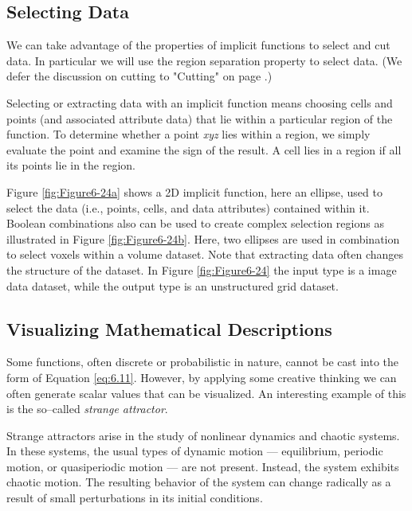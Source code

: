 \subsection{Selecting Data}

We can take advantage of the properties of implicit functions to select and cut data. In particular we will use the region separation property to select data. (We defer the discussion on cutting to "Cutting" on page \pageref{subsec:cutting}.)

Selecting or extracting data with an implicit function means choosing cells and points (and associated attribute data) that lie within a particular region of the function. To determine whether a point \emph{xyz} lies within a region, we simply evaluate the point and examine the sign of the result. A cell lies in a region if all its points lie in the region.

Figure \ref{fig:Figure6-24a} shows a 2D implicit function, here an ellipse, used to select the data (i.e., points, cells, and data attributes) contained within it. Boolean combinations also can be used to create complex selection regions as illustrated in Figure \ref{fig:Figure6-24b}. Here, two ellipses are used in combination to select voxels within a volume dataset. Note that extracting data often changes the structure of the dataset. In Figure \ref{fig:Figure6-24} the input type is a image data dataset, while the output type is an unstructured grid dataset.

\subsection{Visualizing Mathematical Descriptions}

Some functions, often discrete or probabilistic in nature, cannot be cast into the form of Equation \ref{eq:6.11}. However, by applying some creative thinking we can often generate scalar values that can be visualized. An interesting example of this is the so--called \emph{strange attractor}.

Strange attractors arise in the study of nonlinear dynamics and chaotic systems. In these systems, the usual types of dynamic motion --- equilibrium, periodic motion, or quasiperiodic motion --- are not present. Instead, the system exhibits chaotic motion. The resulting behavior of the system can change radically as a result of small perturbations in its initial conditions.

